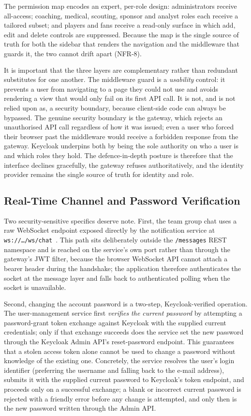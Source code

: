 The permission map encodes an expert, per-role design: administrators receive
all-access; coaching, medical, scouting, sponsor and analyst roles each receive a
tailored subset; and players and fans receive a read-only surface in which add, edit
and delete controls are suppressed. Because the map is the single source of truth for
both the sidebar that renders the navigation and the middleware that guards it, the
two cannot drift apart (NFR-8).

It is important that the three layers are complementary rather than redundant
substitutes for one another. The middleware guard is a \emph{usability} control: it
prevents a user from navigating to a page they could not use and avoids rendering a
view that would only fail on its first API call. It is not, and is not relied upon as,
a security boundary, because client-side code can always be bypassed. The genuine
security boundary is the gateway, which rejects an unauthorised API call regardless of
how it was issued; even a user who forced their browser past the middleware would
receive a forbidden response from the gateway. Keycloak underpins both by being the
sole authority on who a user is and which roles they hold. The defence-in-depth posture
is therefore that the interface declines gracefully, the gateway refuses
authoritatively, and the identity provider remains the single source of truth for
identity and role.

\subsection{Real-Time Channel and Password Verification}

Two security-sensitive specifics deserve note. First, the team group chat uses a raw
WebSocket endpoint exposed directly by the notification service at
\texttt{ws://\dots/ws/chat}~\cite{websocket}. This path sits deliberately outside the
\texttt{/messages} REST namespace and is reached on the service's own port rather than
through the gateway's JWT filter, because the browser WebSocket API cannot attach a
bearer header during the handshake; the application therefore authenticates the socket
at the message layer and falls back to authenticated polling when the socket is
unavailable.

Second, changing the account password is a two-step, Keycloak-verified operation. The
user-management service first \emph{verifies the current password} by attempting a
password-grant token exchange against Keycloak with the supplied current credentials;
only if that exchange succeeds does the service set the new password through the
Keycloak Admin API's reset-password endpoint. This guarantees that a stolen access
token alone cannot be used to change a password without knowledge of the existing one.
Concretely, the service resolves the user's login identifier (preferring the username
and falling back to the e-mail address), submits it with the supplied current password
to Keycloak's token endpoint, and proceeds only on a successful exchange; a blank or
incorrect current password is rejected with a friendly error before any change is
attempted, and only then is the new password written through the Admin API.

